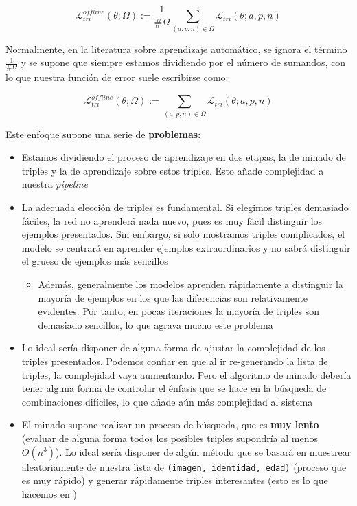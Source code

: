 \begin{equation}
    \mathcal{L}_{tri}^{offline}(\theta; \Omega) := \frac{1}{\#\Omega} \sum_{(a, p, n) \in \Omega} \mathcal{L}_{tri}(\theta; a, p, n)
\end{equation}

\begin{observacion}

Normalmente, en la literatura sobre aprendizaje automático, se ignora el término $\frac{1}{\#\Omega}$ y se supone que siempre estamos dividiendo por el número de sumandos, con lo que nuestra función de error suele escribirse como:

\begin{equation}
    \mathcal{L}_{tri}^{offline}(\theta; \Omega) := \sum_{(a, p, n) \in \Omega} \mathcal{L}_{tri}(\theta; a, p, n)
\end{equation}


\end{observacion}

Este enfoque supone una serie de \textbf{problemas}:

\begin{itemize}
    \item Estamos dividiendo el proceso de aprendizaje en dos etapas, la de minado de triples y la de aprendizaje sobre estos triples. Esto añade complejidad a nuestra \textit{pipeline}
    \item La adecuada elección de triples es fundamental. Si elegimos triples demasiado fáciles, la red no aprenderá nada nuevo, pues es muy fácil distinguir los ejemplos presentados. Sin embargo, si solo mostramos triples complicados, el modelo se centrará en aprender ejemplos extraordinarios y no sabrá distinguir el grueso de ejemplos más sencillos
        \begin{itemize}
            \item Además, generalmente los modelos aprenden rápidamente a distinguir la mayoría de ejemplos en los que las diferencias son relativamente evidentes. Por tanto, en pocas iteraciones la mayoría de triples son demasiado sencillos, lo que agrava mucho este problema
        \end{itemize}
    \item Lo ideal sería disponer de alguna forma de ajustar la complejidad de los triples presentados. Podemos confiar en que al ir re-generando la lista de triples, la complejidad vaya aumentando. Pero el algoritmo de minado debería tener alguna forma de controlar el énfasis que se hace en la búsqueda de combinaciones difíciles, lo que añade aún más complejidad al sistema
    \item El minado supone realizar un proceso de búsqueda, que es \textbf{muy lento} (evaluar de alguna forma todos los posibles triples supondría al menos $O(n^3)$). Lo ideal sería disponer de algún método que se basará en muestrear aleatoriamente de nuestra lista de \lstinline{(imagen, identidad, edad)} (proceso que es muy rápido) y generar rápidamente triples interesantes (esto es lo que hacemos en )
\end{itemize}

